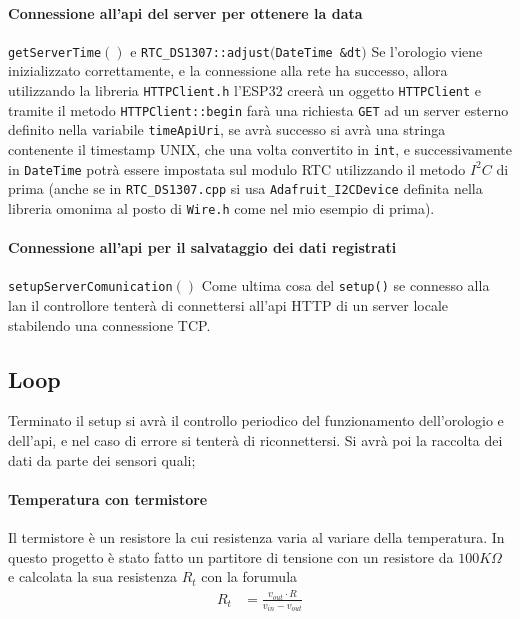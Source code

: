 \documentclass{article}
\begin{document}
    \paragraph{Connessione all'api del server per ottenere la data} \texttt{getServerTime$()$} e \texttt{RTC\_DS1307::adjust$($DateTime\ \&dt$)$} Se l'orologio viene inizializzato correttamente, e la connessione alla rete ha successo, allora utilizzando la libreria \texttt{HTTPClient.h} l'ESP32 creerà un oggetto \texttt{HTTPClient} e tramite il metodo \texttt{HTTPClient::begin} farà una richiesta \texttt{GET} ad un server esterno definito nella variabile \texttt{timeApiUri}, se avrà successo si avrà una stringa contenente il timestamp UNIX, che una volta convertito in \texttt{int}, e successivamente in \texttt{DateTime} potrà essere impostata sul modulo RTC utilizzando il metodo $I^{2}C$ di prima (anche se in \texttt{RTC\_DS1307.cpp} si usa \texttt{Adafruit\_I2CDevice} definita nella libreria omonima al posto di \texttt{Wire.h} come nel mio esempio di prima).

    \paragraph{Connessione all'api per il salvataggio dei dati registrati} \texttt{setupServerComunication$()$} Come ultima cosa del \texttt{setup()} se connesso alla lan il controllore tenterà di connettersi all'api HTTP di un server locale stabilendo una connessione TCP.

    \subsection{Loop} Terminato il setup si avrà il controllo periodico del funzionamento dell'orologio e dell'api, e nel caso di errore si tenterà di riconnettersi. Si avrà poi la raccolta dei dati da parte dei sensori quali;

    \paragraph{Temperatura con termistore} Il termistore è un resistore la cui resistenza varia al variare della temperatura. In questo progetto è stato fatto un partitore di tensione con un resistore da $100K\Omega$ e calcolata la sua resistenza $R_t$ con la forumula
    \begin{align*}
        R_{t} & = \frac{v_{out} \cdot R}{v_{in} - v_{out}}
    \end{align*}
\end{document}
